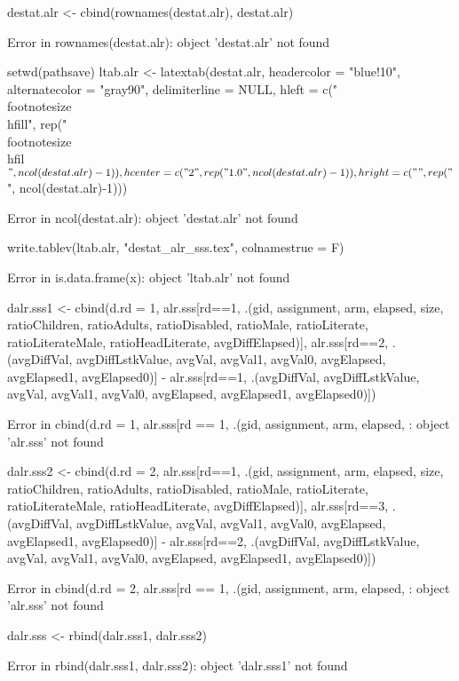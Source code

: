 \begin{Schunk}
\begin{Sinput}
destat.alr <- cbind(rownames(destat.alr), destat.alr)
\end{Sinput}
\begin{Soutput}
Error in rownames(destat.alr): object 'destat.alr' not found
\end{Soutput}
\begin{Sinput}
setwd(pathsave)
ltab.alr <- latextab(destat.alr, headercolor = "blue!10", 
	alternatecolor = "gray90", delimiterline = NULL, 
	hleft = c("\\footnotesize\\hfill", rep("\\footnotesize\\hfil$", ncol(destat.alr)-1)), 
	hcenter = c("2", rep("1.0", ncol(destat.alr)-1)), 
	hright = c("", rep("$", ncol(destat.alr)-1)))
\end{Sinput}
\begin{Soutput}
Error in ncol(destat.alr): object 'destat.alr' not found
\end{Soutput}
\begin{Sinput}
write.tablev(ltab.alr, "destat_alr_sss.tex", colnamestrue = F)
\end{Sinput}
\begin{Soutput}
Error in is.data.frame(x): object 'ltab.alr' not found
\end{Soutput}
\begin{Sinput}
dalr.sss1 <- cbind(d.rd = 1, alr.sss[rd==1, .(gid, assignment, arm, elapsed, 
	size, ratioChildren, ratioAdults, ratioDisabled, ratioMale, ratioLiterate, 
	ratioLiterateMale, ratioHeadLiterate, avgDiffElapsed)], 
	alr.sss[rd==2, .(avgDiffVal, avgDiffLstkValue, avgVal, avgVal1, avgVal0, avgElapsed, avgElapsed1, avgElapsed0)] - 
	alr.sss[rd==1, .(avgDiffVal, avgDiffLstkValue, avgVal, avgVal1, avgVal0, avgElapsed, avgElapsed1, avgElapsed0)])
\end{Sinput}
\begin{Soutput}
Error in cbind(d.rd = 1, alr.sss[rd == 1, .(gid, assignment, arm, elapsed, : object 'alr.sss' not found
\end{Soutput}
\begin{Sinput}
dalr.sss2 <- cbind(d.rd = 2, alr.sss[rd==1, .(gid, assignment, arm, elapsed, 
	size, ratioChildren, ratioAdults, ratioDisabled, ratioMale, ratioLiterate, 
	ratioLiterateMale, ratioHeadLiterate, avgDiffElapsed)], 
	alr.sss[rd==3, .(avgDiffVal, avgDiffLstkValue, avgVal, avgVal1, avgVal0, avgElapsed, avgElapsed1, avgElapsed0)] - 
	alr.sss[rd==2, .(avgDiffVal, avgDiffLstkValue, avgVal, avgVal1, avgVal0, avgElapsed, avgElapsed1, avgElapsed0)])
\end{Sinput}
\begin{Soutput}
Error in cbind(d.rd = 2, alr.sss[rd == 1, .(gid, assignment, arm, elapsed, : object 'alr.sss' not found
\end{Soutput}
\begin{Sinput}
dalr.sss <- rbind(dalr.sss1, dalr.sss2)
\end{Sinput}
\begin{Soutput}
Error in rbind(dalr.sss1, dalr.sss2): object 'dalr.sss1' not found
\end{Soutput}
\end{Schunk}

